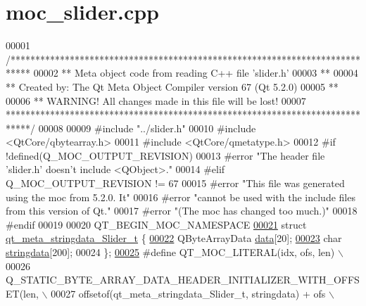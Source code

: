 \hypertarget{a00070_source}{\section{moc\+\_\+slider.\+cpp}
\label{a00070_source}
}

\begin{DoxyCode}
00001 \textcolor{comment}{/****************************************************************************}
00002 \textcolor{comment}{** Meta object code from reading C++ file 'slider.h'}
00003 \textcolor{comment}{**}
00004 \textcolor{comment}{** Created by: The Qt Meta Object Compiler version 67 (Qt 5.2.0)}
00005 \textcolor{comment}{**}
00006 \textcolor{comment}{** WARNING! All changes made in this file will be lost!}
00007 \textcolor{comment}{*****************************************************************************/}
00008 
00009 \textcolor{preprocessor}{#include "../slider.h"}
00010 \textcolor{preprocessor}{#include <QtCore/qbytearray.h>}
00011 \textcolor{preprocessor}{#include <QtCore/qmetatype.h>}
00012 \textcolor{preprocessor}{#if !defined(Q\_MOC\_OUTPUT\_REVISION)}
00013 \textcolor{preprocessor}{#error "The header file 'slider.h' doesn't include <QObject>."}
00014 \textcolor{preprocessor}{#elif Q\_MOC\_OUTPUT\_REVISION != 67}
00015 \textcolor{preprocessor}{#error "This file was generated using the moc from 5.2.0. It"}
00016 \textcolor{preprocessor}{#error "cannot be used with the include files from this version of Qt."}
00017 \textcolor{preprocessor}{#error "(The moc has changed too much.)"}
00018 \textcolor{preprocessor}{#endif}
00019 
00020 QT\_BEGIN\_MOC\_NAMESPACE
\hypertarget{a00070_source_l00021}{}\hyperlink{a00070}{00021} \textcolor{keyword}{struct }\hyperlink{a00070_d3/dd1/a00214}{qt\_meta\_stringdata\_Slider\_t} \{
\hypertarget{a00070_source_l00022}{}\hyperlink{a00070_a28e23ecab9373bb818a81f9a092a52de}{00022}     QByteArrayData \hyperlink{a00070_a28e23ecab9373bb818a81f9a092a52de}{data}[20];
\hypertarget{a00070_source_l00023}{}\hyperlink{a00070_aa9f32a65077d2d4f1c99ac3536a308da}{00023}     \textcolor{keywordtype}{char} \hyperlink{a00070_aa9f32a65077d2d4f1c99ac3536a308da}{stringdata}[200];
00024 \};
\hypertarget{a00070_source_l00025}{}\hyperlink{a00070_a75bb9482d242cde0a06c9dbdc6b83abe}{00025} \textcolor{preprocessor}{#define QT\_MOC\_LITERAL(idx, ofs, len) \(\backslash\)}
00026 \textcolor{preprocessor}{    Q\_STATIC\_BYTE\_ARRAY\_DATA\_HEADER\_INITIALIZER\_WITH\_OFFSET(len, \(\backslash\)}
00027 \textcolor{preprocessor}{    offsetof(qt\_meta\_stringdata\_Slider\_t, stringdata) + ofs \(\backslash\)}

\end{DoxyCode}
